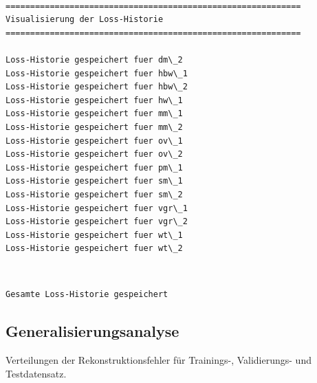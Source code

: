 \documentclass[11pt]{article}
\begin{document}
    \begin{Verbatim}[commandchars=\\\{\}]

============================================================
Visualisierung der Loss-Historie
============================================================

Loss-Historie gespeichert fuer dm\_2
Loss-Historie gespeichert fuer hbw\_1
Loss-Historie gespeichert fuer hbw\_2
Loss-Historie gespeichert fuer hw\_1
Loss-Historie gespeichert fuer mm\_1
Loss-Historie gespeichert fuer mm\_2
Loss-Historie gespeichert fuer ov\_1
Loss-Historie gespeichert fuer ov\_2
Loss-Historie gespeichert fuer pm\_1
Loss-Historie gespeichert fuer sm\_1
Loss-Historie gespeichert fuer sm\_2
Loss-Historie gespeichert fuer vgr\_1
Loss-Historie gespeichert fuer vgr\_2
Loss-Historie gespeichert fuer wt\_1
Loss-Historie gespeichert fuer wt\_2
    \end{Verbatim}

    \begin{center}
    \end{center}
    { \hspace*{\fill} \\}
    
    \begin{Verbatim}[commandchars=\\\{\}]
Gesamte Loss-Historie gespeichert
    \end{Verbatim}

    \subsection{Generalisierungsanalyse}\label{generalisierungsanalyse}

Verteilungen der Rekonstruktionsfehler für Trainings-, Validierungs- und
Testdatensatz.
\end{document}
